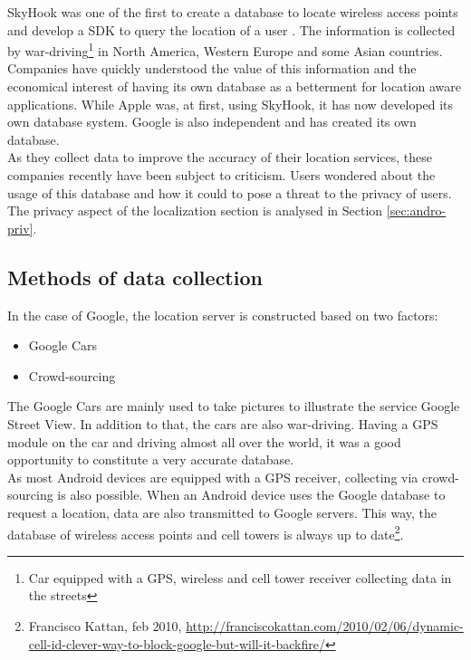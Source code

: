SkyHook was one of the first to create a database to locate wireless access points and develop a SDK to query the location of a user .
The information is collected by war-driving\footnote{Car equipped with a GPS, wireless and cell tower receiver collecting data in the streets} in North America, Western Europe and some Asian countries\cite{skyhook-coverage}.\\

Companies have quickly understood the value of this information and the economical interest of having its own database as a betterment for location aware applications.
While Apple was, at first, using SkyHook, it has now developed its own database system.
Google is also independent and has created its own database.\\

As they collect data to improve the accuracy of their location services, these companies recently have been subject to criticism.
Users wondered about the usage of this database and how it could to pose a threat to the privacy of users.
The privacy aspect of the localization section is analysed in Section \ref{sec:andro-priv}.

\subsection{Methods of data collection}
In the case of Google, the location server is constructed based on two factors:
\begin{itemize}
\item Google Cars
\item Crowd-sourcing
\end{itemize}

The Google Cars are mainly used to take pictures to illustrate the service Google Street View.
In addition to that, the cars are also war-driving.
Having a GPS module on the car and driving almost all over the world, it was a good opportunity to constitute a very accurate database.\\

As most Android devices are equipped with a GPS receiver, collecting via crowd-sourcing is also possible.
When an Android device uses the Google database to request a location, data are also transmitted to Google servers.
This way, the database of wireless access points and cell towers is always up to date\footnote{Francisco Kattan, feb 2010, \url{http://franciscokattan.com/2010/02/06/dynamic-cell-id-clever-way-to-block-google-but-will-it-backfire/}}.


